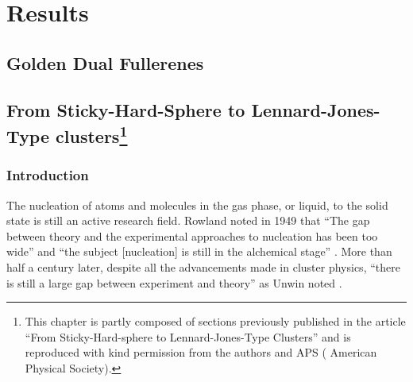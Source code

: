 
\part{Results}
\label{sec:results}

\chapter{Golden Dual Fullerenes}
\label{sec:goldendualfullerenes}

\chapter[From Sticky-Hard-Sphere to Lennard-Jones-Type clusters]{
    From Sticky-Hard-Sphere to Lennard-Jones-Type clusters\footnote{This
    chapter is partly composed of sections previously published in the article
    ``From Sticky-Hard-sphere to Lennard-Jones-Type Clusters''\autocite{} and
    is reproduced with kind permission from the authors and APS ( American Physical Society).}
}
\label{sec:fromstickyhardspheretoLJtypeclusters}


\section{Introduction}


The nucleation of atoms and molecules in the gas phase, or liquid, to the solid
state is still an active research
field\autocite{Stillinger_Packingstructurestransitions_1984,
Martin-1996,Wales-1996, Vlieg_atomicscaleunderstandingcrystal_2007, Arkus-2010,
Woodley-2010, Karthika-2016, Holmes-Cerfon_StickySphereClusters_2017}.  Rowland
noted in 1949 that ``The gap between theory and the experimental approaches to
nucleation has been too wide'' and ``the subject [nucleation] is still in the
alchemical stage'' \autocite{Rowland-1949}. More than half a century later,
despite all the advancements made in cluster physics, ``there is still a large
gap between experiment and theory'' as Unwin noted \autocite{Unwin-2007}.

